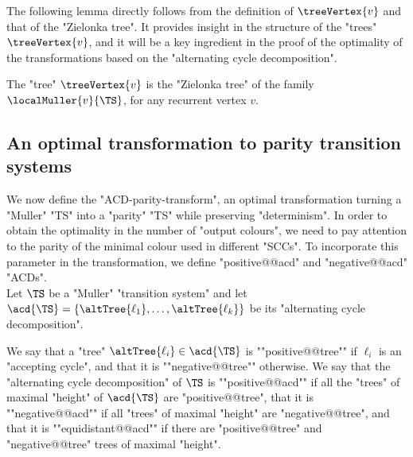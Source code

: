 \documentclass{theoretics}
\begin{document}
The following lemma directly follows from the definition of $\treeVertex{v}$ and that of the "Zielonka tree". It provides insight in the structure of the "trees" $\treeVertex{v}$, and it will be a key ingredient in the proof of the optimality of the transformations based on the "alternating cycle decomposition".

\begin{lemma}\label{lemma-acd:tree_q_ZT_local_Muller}
	The "tree" $\treeVertex{v}$
	 is the "Zielonka tree" of the family $\localMuller{v}{\TS}$,\footnotemark{} for any recurrent vertex $v$.
\end{lemma}

\subsection{An optimal transformation to parity transition systems}\label{subsec-acd: parity-transformation}
We now define the "ACD-parity-transform", an optimal transformation turning a "Muller" "TS" into a "parity" "TS" while preserving "determinism". In order to obtain the optimality in the number of "output colours", we need to pay attention to the parity of the minimal colour used in different "SCCs". To incorporate this parameter in the transformation, we define "positive@@acd" and "negative@@acd" "ACDs".\\

Let $\TS$ be a "Muller" "transition system" and let $\acd{\TS} = \{\altTree{\ell_1},\dots, \altTree{\ell_k}\}$ be its "alternating cycle decomposition".


\AP We say that a "tree" $\altTree{\ell_i}\in \acd{\TS}$ is ""positive@@tree"" if $\ell_i$ is an "accepting cycle", and that it is ""negative@@tree"" otherwise.
\AP We say that the "alternating cycle decomposition" of $\TS$ is ""positive@@acd"" if all the "trees" of maximal "height" of $\acd{\TS}$ are "positive@@tree", that it is ""negative@@acd"" if all "trees" of maximal "height" are "negative@@tree", and that it is ""equidistant@@acd"" if there are "positive@@tree" and "negative@@tree" trees of maximal "height".
\end{document}
